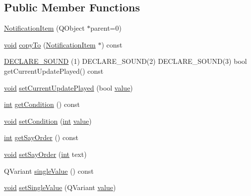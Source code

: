 \subsection*{Public Member Functions}
\begin{DoxyCompactItemize}
\item 
\hyperlink{group__notifyplugin_ga382be87567eab960b4bd89e2c7238ba8}{Notification\-Item} (Q\-Object $\ast$parent=0)
\item 
\hyperlink{group___u_a_v_objects_plugin_ga444cf2ff3f0ecbe028adce838d373f5c}{void} \hyperlink{group__notifyplugin_ga308d07be5a887bb4e35319a55c70fb06}{copy\-To} (\hyperlink{class_notification_item}{Notification\-Item} $\ast$) const 
\item 
\hyperlink{group__notifyplugin_gafd8fcfb284be8c92e29aba742748d4b8}{D\-E\-C\-L\-A\-R\-E\-\_\-\-S\-O\-U\-N\-D} (1) D\-E\-C\-L\-A\-R\-E\-\_\-\-S\-O\-U\-N\-D(2) D\-E\-C\-L\-A\-R\-E\-\_\-\-S\-O\-U\-N\-D(3) bool get\-Current\-Update\-Played() const 
\item 
\hyperlink{group___u_a_v_objects_plugin_ga444cf2ff3f0ecbe028adce838d373f5c}{void} \hyperlink{group__notifyplugin_ga3df23419f46ace03f4874972e2a14579}{set\-Current\-Update\-Played} (bool \hyperlink{glext_8h_aa0e2e9cea7f208d28acda0480144beb0}{value})
\item 
\hyperlink{ioapi_8h_a787fa3cf048117ba7123753c1e74fcd6}{int} \hyperlink{group__notifyplugin_ga04c987109a0ab4c1f9d719a6c0e3096a}{get\-Condition} () const 
\item 
\hyperlink{group___u_a_v_objects_plugin_ga444cf2ff3f0ecbe028adce838d373f5c}{void} \hyperlink{group__notifyplugin_gab14a508f3cd7fd060939a7c8320b35e2}{set\-Condition} (\hyperlink{ioapi_8h_a787fa3cf048117ba7123753c1e74fcd6}{int} \hyperlink{glext_8h_aa0e2e9cea7f208d28acda0480144beb0}{value})
\item 
\hyperlink{ioapi_8h_a787fa3cf048117ba7123753c1e74fcd6}{int} \hyperlink{group__notifyplugin_ga395bd37d71abbcb58be1b077e0dd83f6}{get\-Say\-Order} () const 
\item 
\hyperlink{group___u_a_v_objects_plugin_ga444cf2ff3f0ecbe028adce838d373f5c}{void} \hyperlink{group__notifyplugin_ga0489a9c8b690360558e02eb562a34974}{set\-Say\-Order} (\hyperlink{ioapi_8h_a787fa3cf048117ba7123753c1e74fcd6}{int} text)
\item 
Q\-Variant \hyperlink{group__notifyplugin_ga2c73d25e5b3deadb7b7aec06957e91c5}{single\-Value} () const 
\item 
\hyperlink{group___u_a_v_objects_plugin_ga444cf2ff3f0ecbe028adce838d373f5c}{void} \hyperlink{group__notifyplugin_gacadb2d38a2a7d648f40454fd26f50ad8}{set\-Single\-Value} (Q\-Variant \hyperlink{glext_8h_aa0e2e9cea7f208d28acda0480144beb0}{value})

\end{DoxyCompactItemize}
